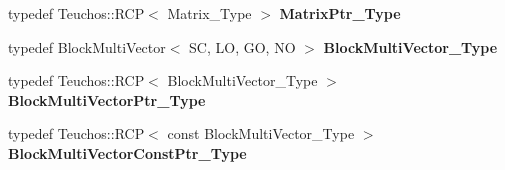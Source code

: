 \begin{DoxyCompactItemize}
\item 
\mbox{\label{classFEDD_1_1ErrorEstimation_afc9db004cde1ce278146dceb3533f2a9}} 
typedef Teuchos\+::\+R\+CP$<$ Matrix\+\_\+\+Type $>$ {\bfseries Matrix\+Ptr\+\_\+\+Type}
\item 
\mbox{\label{classFEDD_1_1ErrorEstimation_a2e1b21d4d97f898a4f6b06f5a889c249}} 
typedef Block\+Multi\+Vector$<$ SC, LO, GO, NO $>$ {\bfseries Block\+Multi\+Vector\+\_\+\+Type}
\item 
\mbox{\label{classFEDD_1_1ErrorEstimation_aa78abbd0cc3c375c1b4482971e28cdea}} 
typedef Teuchos\+::\+R\+CP$<$ Block\+Multi\+Vector\+\_\+\+Type $>$ {\bfseries Block\+Multi\+Vector\+Ptr\+\_\+\+Type}
\item 
\mbox{\label{classFEDD_1_1ErrorEstimation_a906e91e900ed67e5559e4d40053b443f}} 
typedef Teuchos\+::\+R\+CP$<$ const Block\+Multi\+Vector\+\_\+\+Type $>$ {\bfseries Block\+Multi\+Vector\+Const\+Ptr\+\_\+\+Type}
\end{DoxyCompactItemize}
